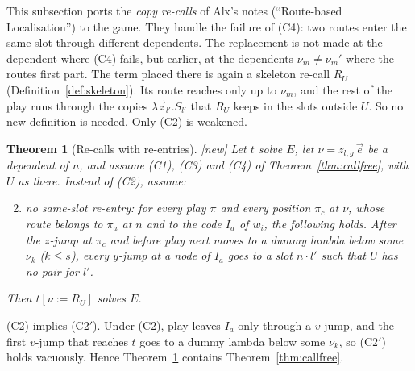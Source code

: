 \documentclass[11pt]{article}
\newcommand{\suc}[2]{#1{\cdot}#2}
\newcommand{\New}{\textsf{[new]}}
\theoremstyle{plain}
\newtheorem{theorem}{Theorem}[section]
\theoremstyle{definition}
\theoremstyle{remark}
\begin{document}
This subsection ports the \emph{copy re-calls} of Alx's notes
(``Route-based Localisation'') to the game.  They handle the failure of
(C4): two routes enter the same slot through different dependents.  The
replacement is not made at the dependent where (C4) fails, but earlier,
at the dependents $\nu_m\neq\nu_m'$ where the routes first part.  The
term placed there is again a skeleton re-call $R_U$
(Definition~\ref{def:skeleton}).  Its route reaches only up to $\nu_m$,
and the rest of the play runs through the copies $\lambda\vec z_{l'}.S_{l'}$
that $R_U$ keeps in the slots outside $U$.  So no new definition is
needed.  Only (C2) is weakened.

\begin{theorem}[Re-calls with re-entries]\label{thm:copyrecall}
\New{} Let $t$ solve $E$, let $\nu=z_{l,g}\,\vec e$ be a dependent of
$n$, and assume (C1), (C3) and (C4) of Theorem~\ref{thm:callfree}, with
$U$ as there.  Instead of (C2), assume:
\begin{enumerate}[(C1$'$)]\setcounter{enumi}{1}
\item \emph{no same-slot re-entry}: for every play $\pi$ and every
  position $\pi_c$ at $\nu$, whose route belongs to $\pi_a$ at $n$ and to
  the code $I_a$ of $w_i$, the following holds.  After the $z$-jump at
  $\pi_c$ and before play next moves to a dummy lambda below some
  $\nu_k$ ($k\le s$), every $y$-jump at a node of $I_a$ goes to a slot
  $\suc n{l'}$ such that $U$ has no pair for $l'$.
\end{enumerate}
Then $t[\nu:=R_U]$ solves $E$.
\end{theorem}

(C2) implies (C2$'$).  Under (C2), play leaves $I_a$ only through a
$v$-jump, and the first $v$-jump that reaches $t$ goes to a dummy lambda
below some $\nu_k$, so (C2$'$) holds vacuously.  Hence
Theorem~\ref{thm:copyrecall} contains Theorem~\ref{thm:callfree}.
\end{document}
